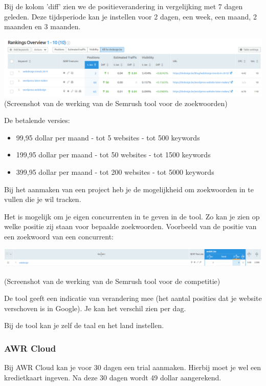 Bij de kolom 'diff' zien we de positieverandering in vergelijking met 7 dagen geleden. Deze tijdsperiode kan je instellen voor 2 dagen, een week, een maand, 2 maanden en 3 maanden. 

\includegraphics[width=\linewidth]{Bachelorproef/bachelor/img/semrushranking.PNG}
(Screenshot van de werking van de Semrush tool voor de zoekwoorden)

De betalende versies: 
\begin{itemize}
\item 99,95 dollar per maand - tot 5 websites - tot 500 keywords
\item 199,95 dollar per maand - tot 50 websites - tot 1500 keywords
\item 399,95 dollar per maand - tot 200 websites - tot 5000 keywords
\end{itemize}

Bij het aanmaken van een project heb je de mogelijkheid om zoekwoorden in te vullen die je wil tracken. 

Het is mogelijk om je eigen concurrenten in te geven in de tool. Zo kan je zien op welke positie zij staan voor bepaalde zoekwoorden. Voorbeeld van de positie van een zoekwoord van een concurrent: 

\includegraphics[width=\linewidth]{Bachelorproef/bachelor/img/semrushcompetitie.PNG}

(Screenshot van de werking van de Semrush tool voor de competitie)

De tool geeft een indicatie van verandering mee (het aantal posities dat je website verschoven is in Google). Je kan het verschil zien per dag. 

Bij de tool kan je zelf de taal en het land instellen. 

\subsubsection{AWR Cloud}
\label{ch: AWR Cloud}
Bij AWR Cloud kan je voor 30 dagen een trial aanmaken. Hierbij moet je wel een kredietkaart ingeven. Na deze 30 dagen wordt 49 dollar aangerekend. 

